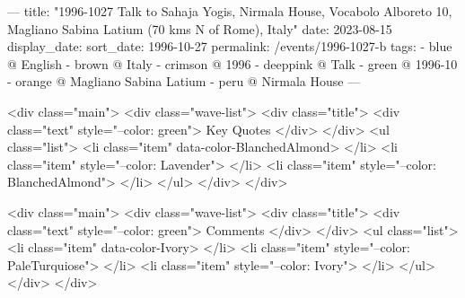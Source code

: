 ---
title: "1996-1027 Talk to Sahaja Yogis, Nirmala House, Vocabolo Alboreto 10, Magliano Sabina Latium (70 kms N of Rome), Italy"
date: 2023-08-15
display_date: 
sort_date: 1996-10-27
permalink: /events/1996-1027-b
tags:
  - blue @ English
  - brown @ Italy
  - crimson @ 1996
  - deeppink @ Talk
  - green @ 1996-10
  - orange @ Magliano Sabina Latium
  - peru @ Nirmala House
---

<div class="main">
  <div class="wave-list">
    <div class="title">
      <div class="text" style="--color: green">
        Key Quotes
      </div>
    </div>
    <ul class="list">
        <li class="item" data-color-BlanchedAlmond>
        </li>
        <li class="item" style="--color: Lavender">
        </li>
        <li class="item" style="--color: BlanchedAlmond">
        </li>
      </ul>
  </div>
</div>

<div class="main">
  <div class="wave-list">
    <div class="title">
      <div class="text" style="--color: green">
        Comments
      </div>
    </div>
    <ul class="list">
        <li class="item" data-color-Ivory>
        </li>
        <li class="item" style="--color: PaleTurquiose">
        </li>
        <li class="item" style="--color: Ivory">
        </li>
      </ul>
  </div>
</div>
